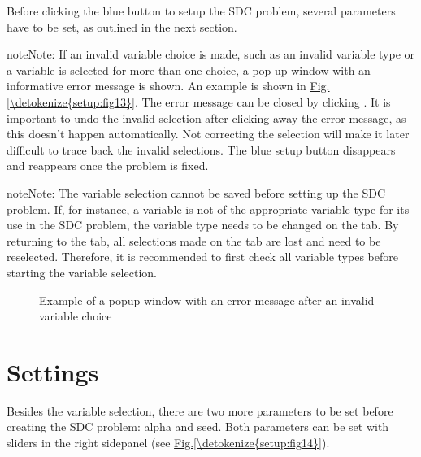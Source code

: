\documentclass[letterpaper,10pt,english]{sphinxmanual}
\begin{document}
Before clicking the blue button to setup the SDC problem, several parameters have to be set,
as outlined in the next section.

\begin{sphinxadmonition}{note}{Note:}
If an invalid variable choice is made, such as an invalid variable type
or a variable is selected for more than one choice, a pop-up window with an informative
error message is shown. An example is shown in \hyperref[\detokenize{setup:fig13}]{Fig.\@ \ref{\detokenize{setup:fig13}}}. The error
message can be closed by clicking .
It is important to undo the invalid selection after clicking away
the error message, as this doesn’t happen automatically.
Not correcting the selection will
make it later difficult to trace back the invalid selections.
The blue setup button disappears and reappears once the problem is fixed.
\end{sphinxadmonition}

\begin{sphinxadmonition}{note}{Note:}
The variable selection cannot be saved before setting up the SDC problem. If, for instance,
a variable is not of the appropriate variable type for its use in the SDC problem,
the variable type needs to be changed on the  tab. By returning to the
 tab, all selections made on the  tab are lost and need to be reselected.
Therefore, it is recommended to first check all variable types before starting the
variable selection.
\end{sphinxadmonition}

\begin{figure}[htbp]
\centering
\capstart

\noindent{}
\caption{Example of a popup window with an error message after an invalid variable choice}\label{\detokenize{setup:fig13}}\label{\detokenize{setup:id4}}\end{figure}


\section{Settings}
\label{\detokenize{setup:settings}}
Besides the variable selection, there are two more parameters to be set before creating
the SDC problem: alpha and seed. Both parameters can be set with sliders
in the right sidepanel (see \hyperref[\detokenize{setup:fig14}]{Fig.\@ \ref{\detokenize{setup:fig14}}}).
\end{document}

